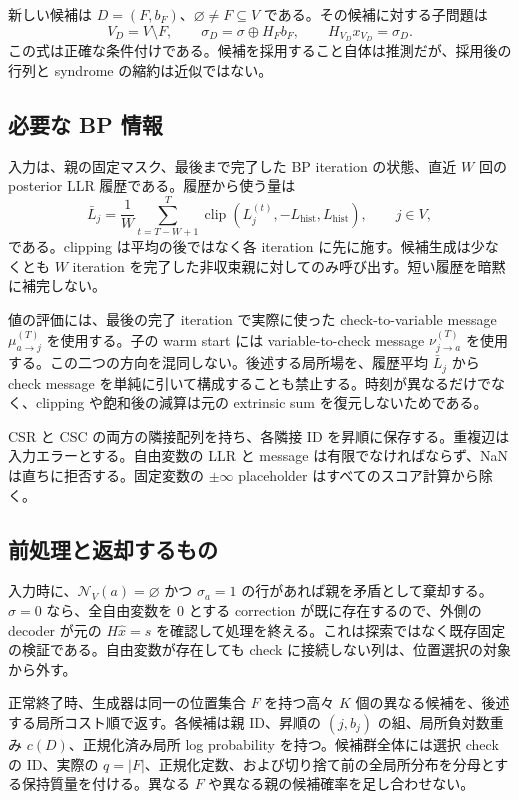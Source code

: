 \documentclass[a4paper,11pt]{ltjsarticle}
\numberwithin{equation}{section}
\theoremstyle{definition}
\newcommand{\N}{\mathcal N}
\newcommand{\clip}{\operatorname{clip}}
\begin{document}
新しい候補は $D=(F,b_F)$、$\varnothing\ne F\subseteq V$ である。その候補に対する子問題は
\begin{equation}
 V_D=V\setminus F,\qquad
 \sigma_D=\sigma\oplus H_Fb_F,\qquad
 H_{V_D}x_{V_D}=\sigma_D.
 \label{eq:child}
\end{equation}
この式は正確な条件付けである。候補を採用すること自体は推測だが、採用後の行列と syndrome の縮約は近似ではない。

\subsection{必要な BP 情報}
入力は、親の固定マスク、最後まで完了した BP iteration の状態、直近 $W$ 回の posterior LLR 履歴である。履歴から使う量は
\begin{equation}
 \bar L_j=\frac1W\sum_{t=T-W+1}^{T}
           \clip(L_j^{(t)},-L_{\mathrm{hist}},L_{\mathrm{hist}}),
 \qquad j\in V,
 \label{eq:mean}
\end{equation}
である。clipping は平均の後ではなく各 iteration に先に施す。候補生成は少なくとも $W$ iteration を完了した非収束親に対してのみ呼び出す。短い履歴を暗黙に補完しない。

値の評価には、最後の完了 iteration で実際に使った check-to-variable message $\mu_{a\to j}^{(T)}$ を使用する。子の warm start には variable-to-check message $\nu_{j\to a}^{(T)}$ を使用する。この二つの方向を混同しない。後述する局所場を、履歴平均 $\bar L_j$ から check message を単純に引いて構成することも禁止する。時刻が異なるだけでなく、clipping や飽和後の減算は元の extrinsic sum を復元しないためである。

CSR と CSC の両方の隣接配列を持ち、各隣接 ID を昇順に保存する。重複辺は入力エラーとする。自由変数の LLR と message は有限でなければならず、NaN は直ちに拒否する。固定変数の $\pm\infty$ placeholder はすべてのスコア計算から除く。

\subsection{前処理と返却するもの}
入力時に、$\N_V(a)=\varnothing$ かつ $\sigma_a=1$ の行があれば親を矛盾として棄却する。$\sigma=0$ なら、全自由変数を $0$ とする correction が既に存在するので、外側の decoder が元の $H\hat x=s$ を確認して処理を終える。これは探索ではなく既存固定の検証である。自由変数が存在しても check に接続しない列は、位置選択の対象から外す。

正常終了時、生成器は同一の位置集合 $F$ を持つ高々 $K$ 個の異なる候補を、後述する局所コスト順で返す。各候補は親 ID、昇順の $(j,b_j)$ の組、局所負対数重み $c(D)$、正規化済み局所 log probability を持つ。候補群全体には選択 check の ID、実際の $q=|F|$、正規化定数、および切り捨て前の全局所分布を分母とする保持質量を付ける。異なる $F$ や異なる親の候補確率を足し合わせない。
\end{document}
